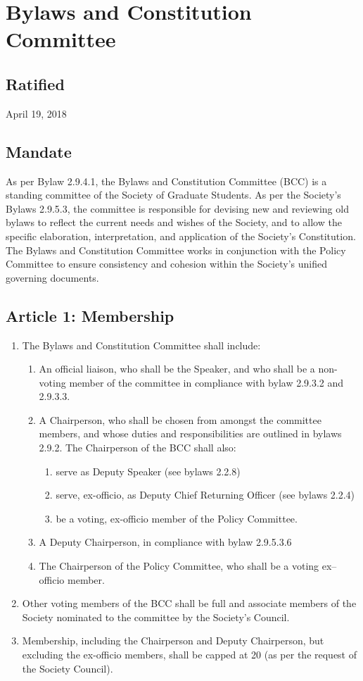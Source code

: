 \section{Bylaws and Constitution Committee}

\subsection{Ratified}
April 19, 2018

\subsection{Mandate}
As per Bylaw 2.9.4.1, the Bylaws and Constitution Committee (BCC) is a standing committee of the Society of Graduate Students. As per the Society's Bylaws 2.9.5.3, the committee is responsible for devising new and reviewing old bylaws to reflect the current needs and wishes of the Society, and to allow the specific elaboration, interpretation, and application of the Society's Constitution. The Bylaws and Constitution Committee works in conjunction with the Policy Committee to ensure consistency and cohesion within the Society's unified governing documents.

\subsection{Article 1: Membership}
\begin{enumerate}[label*=\arabic*., align=left]	
\item The Bylaws and Constitution Committee shall include:
\begin{enumerate}[label*=\arabic*., align=left]	
\item An official liaison, who shall be the Speaker, and who shall be a non-voting member of the committee in compliance with bylaw 2.9.3.2 and 2.9.3.3.
\item A Chairperson, who shall be chosen from amongst the committee members, and whose duties and responsibilities are outlined in bylaws 2.9.2. The Chairperson of the BCC shall also:
\begin{enumerate}
\item serve as Deputy Speaker (see bylaws 2.2.8)
\item serve, ex-officio, as Deputy Chief Returning Officer (see bylaws 2.2.4)
\item be a voting, ex-officio member of the Policy Committee.
\end{enumerate}
\item A Deputy Chairperson, in compliance with bylaw 2.9.5.3.6
\item The Chairperson of the Policy Committee, who shall be a voting ex–officio member.
\end{enumerate}
\item Other voting members of the BCC shall be full and associate members of the Society nominated to the committee by the Society's Council.
\item Membership, including the Chairperson and Deputy Chairperson, but excluding the ex-officio members, shall be capped at 20 (as per the request of the Society Council).
\end{enumerate}

